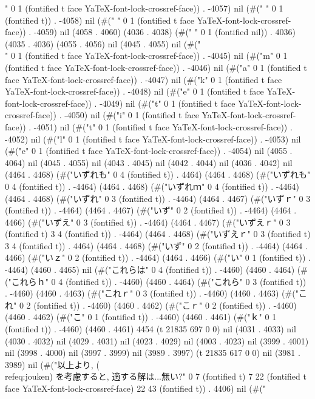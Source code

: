 " 0 1 (fontified t face YaTeX-font-lock-crossref-face)) . -4057) nil (#(" " 0 1 (fontified t)) . -4058) nil (#(" " 0 1 (fontified t face YaTeX-font-lock-crossref-face)) . -4059) nil (4058 . 4060) (4036 . 4038) (#(" " 0 1 (fontified nil)) . 4036) (4035 . 4036) (4055 . 4056) nil (4045 . 4055) nil (#("\\" 0 1 (fontified t face YaTeX-font-lock-crossref-face)) . -4045) nil (#("m" 0 1 (fontified t face YaTeX-font-lock-crossref-face)) . -4046) nil (#("a" 0 1 (fontified t face YaTeX-font-lock-crossref-face)) . -4047) nil (#("k" 0 1 (fontified t face YaTeX-font-lock-crossref-face)) . -4048) nil (#("e" 0 1 (fontified t face YaTeX-font-lock-crossref-face)) . -4049) nil (#("t" 0 1 (fontified t face YaTeX-font-lock-crossref-face)) . -4050) nil (#("i" 0 1 (fontified t face YaTeX-font-lock-crossref-face)) . -4051) nil (#("t" 0 1 (fontified t face YaTeX-font-lock-crossref-face)) . -4052) nil (#("l" 0 1 (fontified t face YaTeX-font-lock-crossref-face)) . -4053) nil (#("e" 0 1 (fontified t face YaTeX-font-lock-crossref-face)) . -4054) nil (4055 . 4064) nil (4045 . 4055) nil (4043 . 4045) nil (4042 . 4044) nil (4036 . 4042) nil (4464 . 4468) (#("いずれも" 0 4 (fontified t)) . 4464) (4464 . 4468) (#("いずれも" 0 4 (fontified t)) . -4464) (4464 . 4468) (#("いずれｍ" 0 4 (fontified t)) . -4464) (4464 . 4468) (#("いずれ" 0 3 (fontified t)) . -4464) (4464 . 4467) (#("いずｒ" 0 3 (fontified t)) . -4464) (4464 . 4467) (#("いず" 0 2 (fontified t)) . -4464) (4464 . 4466) (#("いずえ" 0 3 (fontified t)) . -4464) (4464 . 4467) (#("いずえｒ" 0 3 (fontified t) 3 4 (fontified t)) . -4464) (4464 . 4468) (#("いずえｒ" 0 3 (fontified t) 3 4 (fontified t)) . 4464) (4464 . 4468) (#("いず" 0 2 (fontified t)) . -4464) (4464 . 4466) (#("いｚ" 0 2 (fontified t)) . -4464) (4464 . 4466) (#("い" 0 1 (fontified t)) . -4464) (4460 . 4465) nil (#("これらは" 0 4 (fontified t)) . -4460) (4460 . 4464) (#("これらｈ" 0 4 (fontified t)) . -4460) (4460 . 4464) (#("これら" 0 3 (fontified t)) . -4460) (4460 . 4463) (#("これｒ" 0 3 (fontified t)) . -4460) (4460 . 4463) (#("これ" 0 2 (fontified t)) . -4460) (4460 . 4462) (#("こｒ" 0 2 (fontified t)) . -4460) (4460 . 4462) (#("こ" 0 1 (fontified t)) . -4460) (4460 . 4461) (#("ｋ" 0 1 (fontified t)) . -4460) (4460 . 4461) 4454 (t 21835 697 0 0) nil (4031 . 4033) nil (4030 . 4032) nil (4029 . 4031) nil (4023 . 4029) nil (4003 . 4023) nil (3999 . 4001) nil (3998 . 4000) nil (3997 . 3999) nil (3989 . 3997) (t 21835 617 0 0) nil (3981 . 3989) nil (#("以上より, (\\ref{eq:jouken}) を考慮すると, 適する解は...無い?" 0 7 (fontified t) 7 22 (fontified t face YaTeX-font-lock-crossref-face) 22 43 (fontified t)) . 4406) nil (#("
